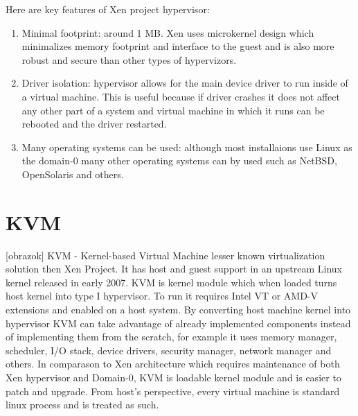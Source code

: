 Here are key features of Xen project hypervisor:
\begin{enumerate}
\item Minimal footprint: around 1 MB. Xen uses microkernel design which minimalizes memory footprint and interface to the guest and is also more robust and secure than other types of hypervizors.
\item Driver isolation: hypervisor allows for the main device driver to run inside of a virtual machine. This is useful because if driver crashes it does not affect any other part of a system and virtual machine in which it runs can be rebooted and the driver restarted.
\item Many operating systems can be used: although most installaions use Linux as the domain-0 many other operating systems can by used such as NetBSD, OpenSolaris and others.
\end{enumerate}


\section{KVM}
[obrazok] KVM - Kernel-based Virtual Machine lesser known virtualization solution then Xen Project. It has host and guest support in an upstream Linux kernel released in early 2007. KVM is kernel module which when loaded turns host kernel into type I hypervisor. To run it requires Intel VT or AMD-V extensions and enabled on a host system. By converting host machine kernel into hypervisor KVM can take advantage of already implemented components instead of implementing them from the scratch, for example it uses memory manager, scheduler, I/O stack, device drivers, security manager, network manager and others. In comparason to Xen architecture which requires maintenance of both Xen hypervisor and Domain-0, KVM is loadable kernel module and is easier to patch and upgrade. From host's perspective, every virtual machine is standard linux process and is treated as such.

